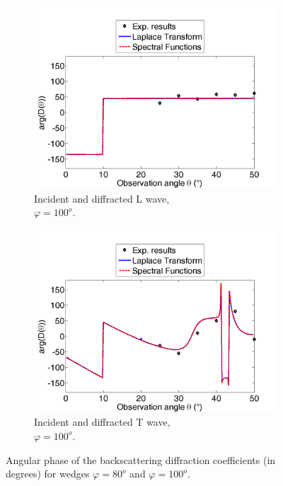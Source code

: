 \begin{figure}[h!]
	\begin{subfigure}[b]{0.49\textwidth}
        \includegraphics[width=\textwidth]{images/chapter3/Retrodiff_phase_100_L.png}
        \caption{Incident and diffracted L wave, \\$\varphi=100^o$.}
        \label{C3:DphL100}
    \end{subfigure}
    \begin{subfigure}[b]{0.49\textwidth}
        \includegraphics[width=\textwidth]{images/chapter3/Retrodiff_phase_100_T.png}
        \caption{Incident and diffracted T wave,\\ $\varphi=100^o$.}
        \label{C3:DphT100}
     \end{subfigure}
     \caption{Angular phase of the backscattering diffraction coefficients (in degrees) for wedges $\varphi=80^o$ and $\varphi=100^o$.}
     \label{C3:expcoeffsph}
\end{figure}

